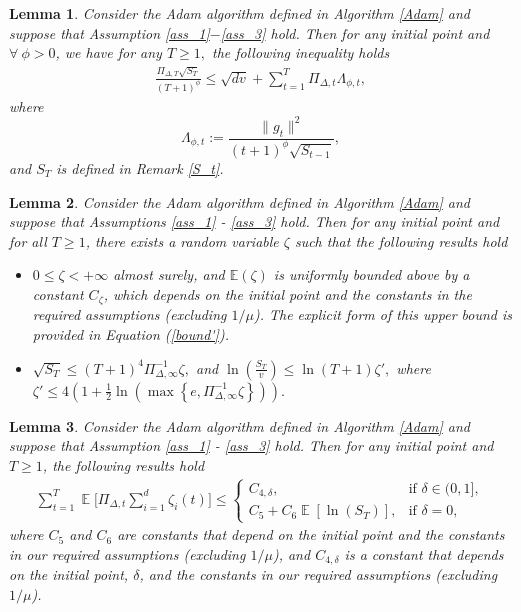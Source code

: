 \documentclass{article} %
\newtheorem{lemma}{Lemma}[section]
\DeclareMathOperator{\Expect}{\mathbb{E}}
\begin{document}
{\begin{lemma}\label{vital_1}
Consider the Adam algorithm defined in Algorithm \ref{Adam} and suppose that Assumption \ref{ass_1}$ - $\ref{ass_3} hold. Then for any initial point and $\forall\ \phi>0$, we have for any $T \geq 1,$ the following inequality holds
\begin{align}\label{adam_-11.5}
\frac{\Pi_{\Delta,T}\sqrt{S_{T}}}{(T+1)^{\phi}}\le  {\sqrt{dv}}+\sum_{t=1}^{T}\Pi_{\Delta,t}\Lambda_{\phi,t},
\end{align}
where 
\[\Lambda_{\phi,t}:=\frac{\|g_{t}\|^{2}}{(t+1)^{\phi}\sqrt{S_{t-1}}},\] and $S_{T}$ is defined in Remark \ref{S_t}.
\end{lemma}}

\begin{lemma}\label{vital_0}
Consider the Adam algorithm defined in Algorithm \ref{Adam} and suppose that Assumptions \ref{ass_1} - \ref{ass_3} hold. Then for any initial point and for all $T \geq 1$, there exists a random variable $\zeta$ such that the following results hold
\begin{itemize}
\item[(a)] $0 \leq \zeta < +\infty$ almost surely, and $\mathbb{E}(\zeta)$ is uniformly bounded above by a constant $C_{\zeta}$, which depends on the initial point and the constants in the required assumptions (excluding $1/\mu$). The explicit form of this upper bound is provided in Equation (\ref{bound'}).
\item[(b)] $\sqrt{S_{T}} \leq (T+1)^{4} \Pi^{-1}_{\Delta,\infty}\zeta,$ and $\ln\left(\frac{S_{T}}{v}\right)\le \ln(T+1)\zeta',$ where $\zeta'\le 4\left(1+\frac{1}{2}{\ln\left(\max\left\{e,\Pi_{\Delta,\infty}^{-1}\zeta\right\}\right)}\right).$
\end{itemize}
\end{lemma}

\begin{lemma}\label{lem_sum}
Consider the Adam algorithm defined in Algorithm \ref{Adam} and suppose that Assumption \ref{ass_1} - \ref{ass_3} hold. Then for any initial point and $T \geq 1$, the following results hold
\begin{align*}
    \sum_{t=1}^{T}\Expect\bigg[\Pi_{\Delta,t}\sum_{i=1}^{d}\zeta_{i}(t)\bigg]\le\begin{cases} 
C_{4,\delta}, & \text{if } \delta \in (0,1], \\
C_{5}+C_{6}\Expect\left[\ln(S_{T})\right], & \text{if } \delta = 0,\end{cases}
\end{align*}
where $C_{5}$ and $C_{6}$ are constants that depend on the initial point and the constants in our required assumptions (excluding $1/\mu$), and $C_{4,\delta}$ is a constant that depends on the initial point, $\delta$, and the constants in our required assumptions (excluding $1/\mu$).
\end{lemma}
\end{document}
